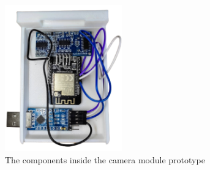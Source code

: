 \begin{figure}[H]
	\centering
	\includegraphics[width=0.45\textwidth]{img/Chap5/Prototype_View_inside.png}
	\caption{The components inside the camera module prototype}
\end{figure}

